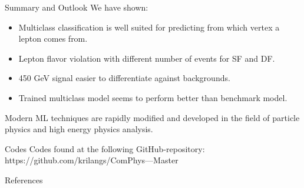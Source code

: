 \documentclass[notes]{beamer}
\begin{document}
	\begin{frame}[t]{Summary and Outlook}
		We have shown:
		\begin{itemize}
			\item Multiclass classification is well suited for predicting from which vertex a lepton comes from.
			\item Lepton flavor violation with different number of events for SF and DF.
			\item 450 GeV signal easier to differentiate against backgrounds.
			\item Trained multiclass model seems to perform better than benchmark model.
		\end{itemize}

		Modern ML techniques are rapidly modified and developed in the field of particle physics and high energy physics analysis.
	\end{frame}

	
	\begin{frame}[t]{Codes}
		Codes found at the following GitHub-repository:\\
		https://github.com/krilangs/ComPhys---Master
	\end{frame}

	\begin{frame}[t]{References}
		
	\end{frame}
\end{document}
